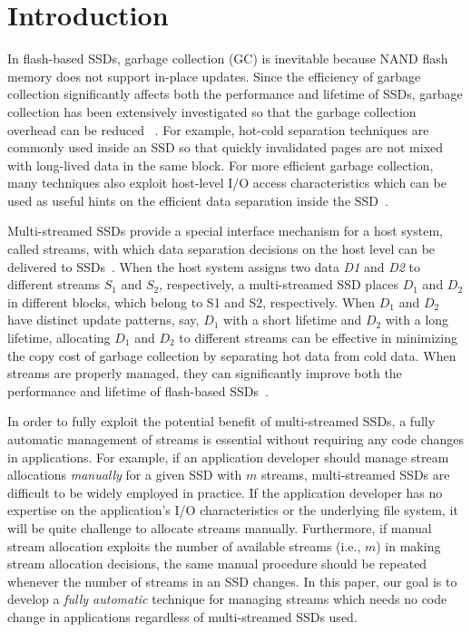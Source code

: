 \section{Introduction}
\label{sec:intro}
In flash-based SSDs, garbage collection (GC) is inevitable because NAND flash 
memory does not support in-place updates.  
Since the efficiency of garbage collection significantly affects  
both the performance and lifetime of SSDs, garbage collection has been extensively 
investigated so that the garbage collection overhead can be reduced
~\cite{GCGreedy, GCVictim, GCTTFlash, HotCold}.  
For example, hot-cold separation techniques are commonly used inside an SSD 
so that quickly invalidated pages are not mixed with long-lived data in the same block.   
For more efficient garbage collection, many techniques also exploit
host-level I/O access characteristics which can be used as useful hints on 
the efficient data separation inside the SSD~\cite{JiTGC, ShadowGC}.

Multi-streamed SSDs provide a special interface mechanism for 
a host system, called streams,  with which data separation decisions 
on the host level can be delivered to SSDs~\cite{T10, MultiStream}.  
When the host system assigns two data {\it D1} and {\it D2} to 
different streams $S_1$ and $S_2$, respectively, a multi-streamed SSD 
places $D_1$ and $D_2$ in different blocks, which belong to S1 and S2, respectively.
When $D_1$ and $D_2$ have distinct update patterns, say, $D_1$ with a short lifetime 
and $D_2$ with a long lifetime, allocating $D_1$ and $D_2$ to different streams 
can be effective in minimizing the copy cost of
garbage collection by separating hot data from cold data.  
When streams are properly managed, they can significantly
improve both the performance and lifetime of 
flash-based SSDs~\cite{MultiStream, Level, FStream, vStream, AutoStream}.

In order to fully exploit the potential benefit of multi-streamed SSDs, 
a fully automatic management of streams is essential without requiring any 
code changes in applications.  For example, if an
application developer should manage stream allocations {\it manually} for 
a given SSD with $m$ streams, multi-streamed SSDs are difficult to be 
widely employed in practice.   If the application
developer has no expertise on the application's I/O characteristics or 
the underlying file system, it will be quite challenge to allocate streams manually.   
Furthermore, if manual stream allocation
exploits the number of available streams (i.e., $m$) in making stream allocation decisions,  
the same manual procedure should be repeated whenever the number of streams in an SSD changes.
In this paper, our goal is to develop 
a {\it fully automatic} technique for managing streams which 
needs no code change in applications regardless of multi-streamed SSDs used.


